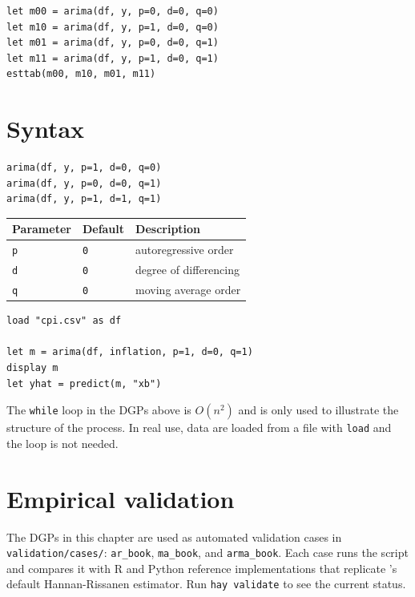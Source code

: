 \begin{lstlisting}[caption={Order selection by AIC}]
let m00 = arima(df, y, p=0, d=0, q=0)
let m10 = arima(df, y, p=1, d=0, q=0)
let m01 = arima(df, y, p=0, d=0, q=1)
let m11 = arima(df, y, p=1, d=0, q=1)
esttab(m00, m10, m01, m11)
\end{lstlisting}

\section{Syntax}

\begin{lstlisting}
arima(df, y, p=1, d=0, q=0)
arima(df, y, p=0, d=0, q=1)
arima(df, y, p=1, d=1, q=1)
\end{lstlisting}

\begin{center}
\begin{tabular}{lll}
\toprule
\textbf{Parameter} & \textbf{Default} & \textbf{Description} \\
\midrule
\texttt{p} & \texttt{0} & autoregressive order \\
\texttt{d} & \texttt{0} & degree of differencing \\
\texttt{q} & \texttt{0} & moving average order \\
\bottomrule
\end{tabular}
\end{center}

\begin{lstlisting}[caption={Typical workflow with real data}]
load "cpi.csv" as df

let m = arima(df, inflation, p=1, d=0, q=1)
display m
let yhat = predict(m, "xb")
\end{lstlisting}

\begin{nota}
  The \lstinline{while} loop in the DGPs above is $O(n^2)$ and is only used to
  illustrate the structure of the process. In real use, data are loaded
  from a file with \lstinline{load} and the loop is not needed.
\end{nota}

\section{Empirical validation}

The DGPs in this chapter are used as automated validation cases in
\texttt{validation/cases/}: \texttt{ar_book}, \texttt{ma_book}, and
\texttt{arma_book}. Each case runs the \hayashi{} script and compares it with
R and Python reference implementations that replicate \hayashi{}'s default
Hannan-Rissanen estimator. Run \lstinline{hay validate} to see the current
status.
